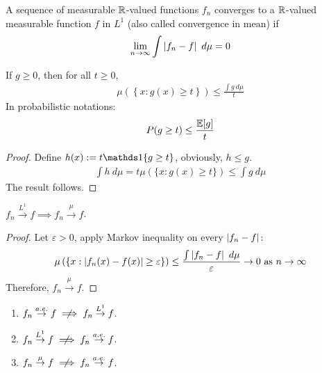\documentclass[11pt]{article}
\begin{document}
	\begin{definition}
		A sequence of measurable $\mathbb{R}$-valued functions $f_n$ converges to a $\mathbb{R}$-valued measurable function $f$ in $L^1$ (also called convergence in mean) if
		\begin{align}
			\lim_{n\to\infty} \int \left \vert {f_n - f} \right \vert\ d\mu = 0
		\end{align}
	\end{definition}
	
	\begin{proposition}
		If $g \geq 0$, then for all $t \geq 0$,
		\begin{align}
			\mu\left(\left\{x : g(x) \geq t \right\}\right) \leq \frac{\int g\ d\mu}{t}
		\end{align}
		In probabilistic notations:
		\begin{align}
			P(g \geq t) \leq \frac{\mathbb{E}[g]}{t}
		\end{align}
		\begin{proof}
			Define $h(x) := t \id{g \geq t}$, obviously, $h \leq g$.
			\begin{align}
				\int h\ d\mu = t \mu(\{x: g(x) \geq t\}) \leq \int g\ d\mu
			\end{align}
			The result follows.
		\end{proof}
	\end{proposition}
	
	\begin{proposition}
		$f_n \overset{L^1}{\to} f \implies f_n \overset{\mu}{\to} f$.
		\begin{proof}
			Let $\varepsilon > 0$, apply Markov inequality on every $\left \vert {f_n - f} \right \vert$:
			\begin{align}
				\mu\left(\left\{x : \left \vert {f_n(x) - f(x)} \right \vert \geq \varepsilon \right\}\right) \leq \frac{\int \left \vert {f_n - f} \right \vert\ d\mu}{\varepsilon} \to 0 \text{{ as }} n \to \infty
			\end{align}
			Therefore, $f_n \overset{\mu}{\to} f$.
		\end{proof}
	\end{proposition}
	\begin{remark} \quad
		\begin{enumerate}
			\item $f_n \overset{a.e.}{\to} f \centernot \implies f_n \overset{L^1}{\to} f$.
			\item $f_n \overset{L^1}{\to} f \centernot \implies f_n \overset{a.e.}{\to} f$.
			\item $f_n \overset{\mu}{\to} f \centernot \implies f_n \overset{a.e.}{\to} f$.
		\end{enumerate}
	\end{remark}
	
\end{document}
